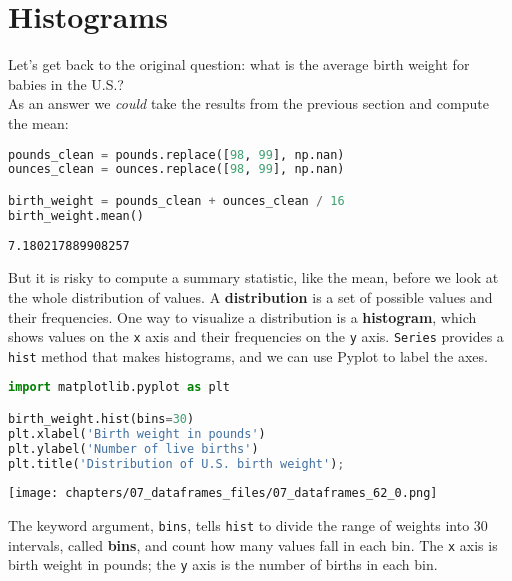 \hypertarget{histograms}{%
\section{Histograms}\label{histograms}}

Let's get back to the original question: what is the average birth
weight for babies in the U.S.?\\
As an answer we \emph{could} take the results from the previous section
and compute the mean:

\begin{lstlisting}[language=Python,style=source]
pounds_clean = pounds.replace([98, 99], np.nan)
ounces_clean = ounces.replace([98, 99], np.nan)

birth_weight = pounds_clean + ounces_clean / 16
birth_weight.mean()
\end{lstlisting}

\begin{lstlisting}[style=output]
7.180217889908257
\end{lstlisting}

But it is risky to compute a summary statistic, like the mean, before we
look at the whole distribution of values. A \textbf{distribution} is a
set of possible values and their frequencies. One way to visualize a
distribution is a \textbf{histogram}, which shows values on the
\passthrough{\lstinline!x!} axis and their frequencies on the
\passthrough{\lstinline!y!} axis. \passthrough{\lstinline!Series!}
provides a \passthrough{\lstinline!hist!} method that makes histograms,
and we can use Pyplot to label the axes.

\begin{lstlisting}[language=Python,style=source]
import matplotlib.pyplot as plt

birth_weight.hist(bins=30)
plt.xlabel('Birth weight in pounds')
plt.ylabel('Number of live births')
plt.title('Distribution of U.S. birth weight');
\end{lstlisting}

\begin{center}
\texttt{[image: chapters/07\_dataframes\_files/07\_dataframes\_62\_0.png]}
\end{center}

The keyword argument, \passthrough{\lstinline!bins!}, tells
\passthrough{\lstinline!hist!} to divide the range of weights into 30
intervals, called \textbf{bins}, and count how many values fall in each
bin. The \passthrough{\lstinline!x!} axis is birth weight in pounds; the
\passthrough{\lstinline!y!} axis is the number of births in each bin.

